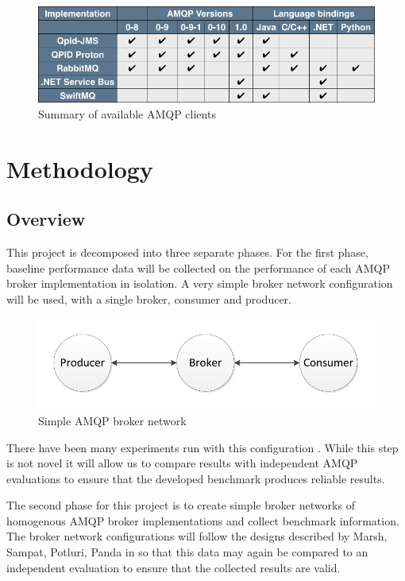 \documentclass{thesis}
\begin{document}
\begin{figure}[h]
\centering
\includegraphics[scale=.5]{client_comparision}  
\caption{Summary of available AMQP clients}
\end{figure}

\chapter{Methodology}
\section{Overview}
This project is decomposed into three separate phases.  For the first phase, baseline performance data will be collected on the performance of each AMQP broker implementation in isolation.  A very simple broker network configuration will be used, with a single broker, consumer and producer.

\begin{figure}[h]
\centering
\includegraphics[scale=.75]{direct_connect}  
\caption{Simple AMQP broker network}
\end{figure}

There have been many experiments run with this configuration \cite{Chirino} \cite{Bayer}.  While this step is not novel it will allow us to compare results with independent AMQP evaluations to ensure that the developed benchmark produces reliable results. 

The second phase for this project is to create simple broker networks of homogenous AMQP broker implementations and collect benchmark information.  The broker network configurations will follow the designs described by Marsh, Sampat, Potluri, Panda in \cite{marsh2010scaling} so that this data may again be compared to an independent evaluation to ensure that the collected results are valid.
\end{document}
